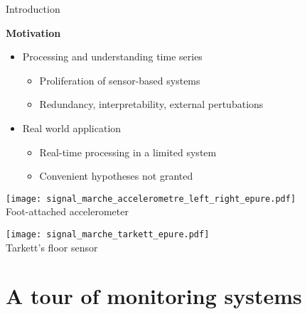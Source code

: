 \begin{frame}{Introduction}{}
\begin{minipage}[t]{\linewidth}
    \textbf{Motivation}
    \begin{itemize}
        \item Processing and understanding time series
        \begin{itemize}
            \item Proliferation of sensor-based systems
            \item Redundancy, interpretability, external pertubations
        \end{itemize}
        \item Real world application
        \begin{itemize}
            \item Real-time processing in a limited system
            \item Convenient hypotheses not granted
        \end{itemize}
    \end{itemize}
\end{minipage}

\vspace{1cm}
\renewcommand{\ratio}{0.4}
    \centering
    \begin{minipage}{\linewidth}
        \centering
        \begin{minipage}{\ratio\linewidth}
            \centering
            \texttt{[image: signal\_marche\_accelerometre\_left\_right\_epure.pdf]}\\
            {\small Foot-attached accelerometer}
        \end{minipage}
        \begin{minipage}{\ratio\linewidth}
            \centering
            \texttt{[image: signal\_marche\_tarkett\_epure.pdf]}\\
            {\small Tarkett's floor sensor}
        \end{minipage}
    \end{minipage}

\end{frame}

\section{A tour of monitoring systems}
